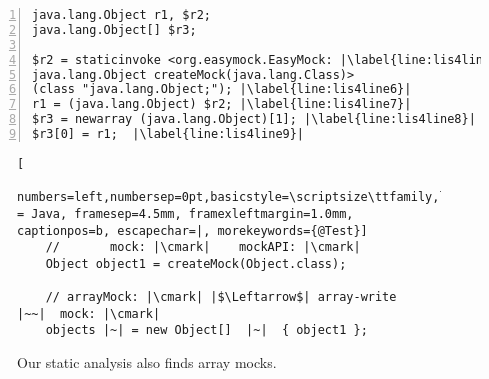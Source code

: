 \begin{lstlisting}[basicstyle=\ttfamily, caption={Jimple Intermediate Representation for the array in Figure~\ref{fig:arrayMockIllustration}.},
numbers=left,numbersep=2pt,basicstyle=\scriptsize\ttfamily, framesep=4.5mm, framexleftmargin=1.0mm, captionpos=b, label=lis:arrayIllustrationIR, escapechar=|, morekeywords={@Test, specialinvoke, virtualinvoke, staticinvoke, newarray}]
java.lang.Object r1, $r2;
java.lang.Object[] $r3;

$r2 = staticinvoke <org.easymock.EasyMock: |\label{line:lis4line4}|
java.lang.Object createMock(java.lang.Class)>
(class "java.lang.Object;"); |\label{line:lis4line6}|
r1 = (java.lang.Object) $r2; |\label{line:lis4line7}|
$r3 = newarray (java.lang.Object)[1]; |\label{line:lis4line8}|
$r3[0] = r1;  |\label{line:lis4line9}|
\end{lstlisting}

\begin{figure}[h]
	\begin{lstlisting}[
	numbers=left,numbersep=0pt,basicstyle=\scriptsize\ttfamily,language = Java, framesep=4.5mm, framexleftmargin=1.0mm, captionpos=b, escapechar=|, morekeywords={@Test}]
	//       mock: |\cmark|    mockAPI: |\cmark|
	Object object1 = createMock(Object.class);
	
	// arrayMock: |\cmark| |$\Leftarrow$| array-write    |~~|  mock: |\cmark|
	objects |~| = new Object[]  |~|  { object1 };
	\end{lstlisting}
	
	\caption{Our static analysis also finds array mocks.}
	\label{fig:arrayMockIllustration}
	
\end{figure}

